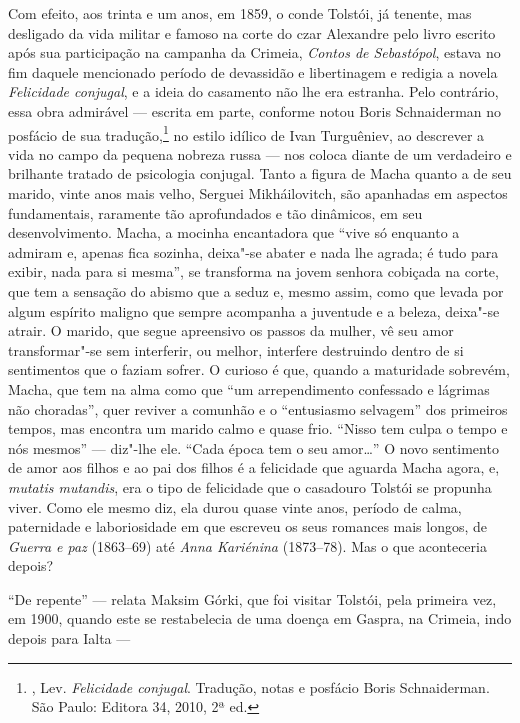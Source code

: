 Com efeito, aos trinta e um anos, em 1859, o conde Tolstói,
já tenente, mas desligado da vida militar e famoso na corte do czar
Alexandre  pelo livro escrito após sua participação na campanha da
Crimeia, \emph{Contos de Sebastópol}, estava no fim daquele mencionado período de devassidão e
libertinagem e redigia a novela \emph{Felicidade conjugal}, e a ideia do casamento
não lhe era estranha. Pelo contrário, essa obra admirável ---
escrita em parte, conforme notou Boris Schnaiderman no posfácio de
sua tradução,\footnote{, Lev. \emph{Felicidade
conjugal}. Tradução, notas e posfácio Boris Schnaiderman. São
Paulo: Editora 34, 2010, 2ª ed.} no estilo idílico de Ivan
Turguêniev, ao descrever a vida no campo da pequena nobreza russa
--- nos coloca diante de um verdadeiro e brilhante tratado de
psicologia conjugal. Tanto a figura de Macha quanto a de seu
marido, vinte anos mais velho, Serguei Mikháilovitch, são
apanhadas em aspectos fundamentais, raramente tão aprofundados e
tão dinâmicos, em seu desenvolvimento. Macha, a mocinha
encantadora que ``vive só enquanto a admiram e, apenas fica
sozinha, deixa"-se abater e nada lhe agrada; é tudo para exibir,
nada para si mesma'', se transforma na jovem senhora cobiçada na
corte, que tem a sensação do abismo que a seduz e, mesmo assim,
como que levada por algum espírito maligno que sempre acompanha a
juventude e a beleza, deixa"-se atrair. O marido, que segue
apreensivo os passos da mulher, vê seu amor transformar"-se sem
interferir, ou melhor, interfere destruindo dentro de si
sentimentos que o faziam sofrer. O curioso é que, quando a
maturidade sobrevém, Macha, que tem na alma como que ``um
arrependimento confessado e lágrimas não choradas'', quer reviver
a comunhão e o ``entusiasmo selvagem'' dos primeiros tempos, mas
encontra um marido calmo e quase frio. ``Nisso tem culpa o tempo
e nós mesmos'' --- diz"-lhe ele. ``Cada época tem o seu
amor\ldots{}'' O novo sentimento de amor aos filhos e ao pai dos
filhos é a felicidade que aguarda Macha agora, e, \emph{mutatis
mutandis}, era o tipo de felicidade que o casadouro Tolstói se
propunha viver. Como ele mesmo diz, ela durou quase vinte anos,
período de calma, paternidade e laboriosidade em que escreveu os
seus romances mais longos, de \emph{Guerra e paz} (1863--69) até
\emph{Anna Kariénina} (1873--78). Mas o que aconteceria depois?

``De repente'' --- relata Maksim Górki, que foi visitar Tolstói, pela primeira vez, em 1900, quando este se restabelecia de uma doença em Gaspra,
na Crimeia, indo depois para Ialta ---

